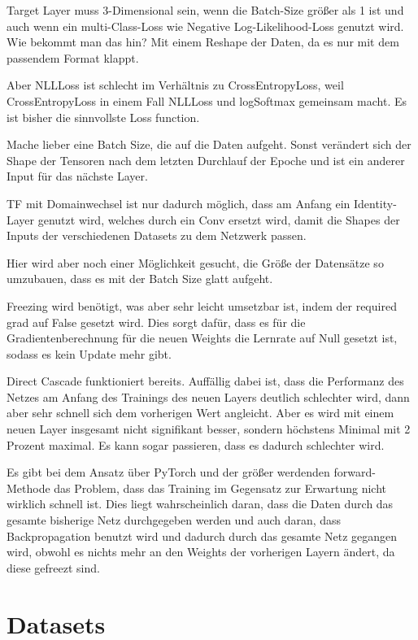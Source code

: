     Target Layer muss 3-Dimensional sein, wenn die Batch-Size größer als 1 
    ist und auch wenn ein multi-Class-Loss wie Negative Log-Likelihood-Loss 
    genutzt wird. Wie bekommt man das hin?
    Mit einem Reshape der Daten, da es nur mit dem passendem Format klappt. 

    Aber NLLLoss ist schlecht im Verhältnis zu CrossEntropyLoss, weil 
    CrossEntropyLoss in einem Fall NLLLoss und logSoftmax gemeinsam macht.
    Es ist bisher die sinnvollste Loss function.

    Mache lieber eine Batch Size, die auf die Daten aufgeht. Sonst verändert 
    sich der Shape der Tensoren nach dem letzten Durchlauf der Epoche und ist 
    ein anderer Input für das nächste Layer.

    TF mit Domainwechsel ist nur dadurch möglich, dass am Anfang ein 
    Identity-Layer genutzt wird, welches durch ein Conv ersetzt wird, 
    damit die Shapes der Inputs der verschiedenen Datasets zu dem 
    Netzwerk passen.

    Hier wird aber noch einer Möglichkeit gesucht, die Größe der 
    Datensätze so umzubauen, dass es mit der Batch Size glatt aufgeht.

    Freezing wird benötigt, was aber sehr leicht umsetzbar ist, indem 
    der required grad auf False gesetzt wird. Dies sorgt dafür, dass 
    es für die Gradientenberechnung für die neuen Weights die Lernrate 
    auf Null gesetzt ist, sodass es kein Update mehr gibt.

    Direct Cascade funktioniert bereits. Auffällig dabei ist, dass 
    die Performanz des Netzes am Anfang des Trainings des neuen Layers 
    deutlich schlechter wird, dann aber sehr schnell sich dem vorherigen 
    Wert angleicht. Aber es wird mit einem neuen Layer insgesamt nicht 
    signifikant besser, sondern höchstens Minimal mit 2 Prozent maximal. 
    Es kann sogar passieren, dass es dadurch schlechter wird.

    Es gibt bei dem Ansatz über PyTorch und der größer werdenden forward-Methode 
    das Problem, dass das Training im Gegensatz zur Erwartung nicht wirklich 
    schnell ist. Dies liegt wahrscheinlich daran, dass die Daten durch das gesamte 
    bisherige Netz durchgegeben werden und auch daran, dass Backpropagation 
    benutzt wird und dadurch durch das gesamte Netz gegangen wird, obwohl es 
    nichts mehr an den Weights der vorherigen Layern ändert, da diese gefreezt 
    sind. 

\section{Datasets}

